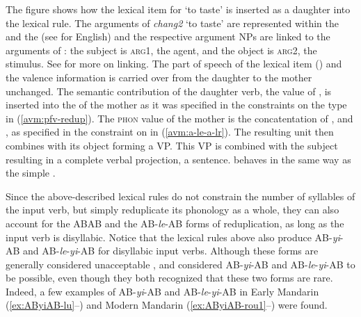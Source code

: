 The figure shows how the lexical item for  `to taste' is inserted as a daughter into
the  lexical rule. The arguments of \emph{chang2} `to taste' are represented within the \spr and
the \compsl (see \citealt{GSag2000a-u} for English) and the respective argument NPs are linked to the
arguments of : the subject is \textsc{arg1}, the agent, and the object is \textsc{arg2},
the stimulus. See \citet{DKW2021a} for more on linking. The part of speech of the lexical item
() and the valence information is carried over from the daughter to the mother
unchanged. The semantic contribution of the daughter verb, the value of , is inserted into
the \relsl of the mother as it was specified in the constraints on the type
 in (\ref{avm:pfv-redup}). The \textsc{phon} value of the mother
is the concatentation of ,  and , as specified in the constraint
on  in (\ref{avm:a-le-a-lr}). The resulting unit  then
combines with its object forming a VP. This VP is combined with the subject resulting in a complete
verbal projection, a sentence.  behaves in the same way as the simple .

Since the above-described lexical rules do not constrain the number of syllables of the input verb, but simply reduplicate its phonology  as a whole,
they can also account for the ABAB and the AB-\textit{le}-AB forms of reduplication,
as long as the input verb is disyllabic.
Notice that  the lexical rules above also produce AB-\textit{yi}-AB and AB\hyp{}\textit{le}\hyp{}\textit{yi}\hyp{}AB for disyllabic input verbs.
Although these forms are generally considered unacceptable \citetext{\citealp[30]{LiThompson1981}; \citealp[275--276]{Hong1999};  \citealp[160]{BascianoMelloni2017}; \citealp[239]{YangWei2017}}, 
\citet[269]{Fan1964} and \citet[143]{Sui2018} considered AB-\textit{yi}-AB and AB-\textit{le}-\textit{yi}-AB to be possible, even though they both recognized that these two forms are rare.
Indeed, a few examples of AB\hyp{}\emph{yi}\hyp{}AB and AB\hyp{}\emph{le}\hyp{}\emph{yi}\hyp{}AB in Early Mandarin %
 (\ref{ex:AByiAB-lu}--) and Modern Mandarin (\ref{ex:AByiAB-rou1}--) were found.

\settowidth{}

